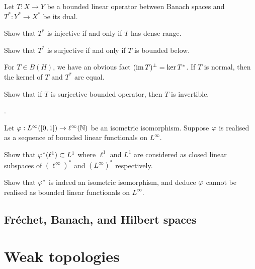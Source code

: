 \documentclass{../note}
\begin{document}
\begin{prb}
Let $T:X\to Y$ be a bounded linear operator between Banach spaces and $T^*:Y^*\to X^*$ be its dual.
\begin{parts}
\item
Show that $T^*$ is injective if and only if $T$ has dense range.
\item
Show that $T^*$ is surjective if and only if $T$ is bounded below.
\end{parts}
\end{prb}

\begin{prb}
For $T\in B(H)$, we have an obvious fact $(\operatorname{im} T)^\perp=\ker T^*$.
If $T$ is normal, then the kernel of $T$ and $T^*$ are equal.
\begin{parts}
\item
Show that if $T$ is surjective bounded operator, then $T$ is invertible.
\end{parts}
\end{prb}


\begin{prb}
.
\end{prb}


\begin{prb}
Let $\varphi:L^\infty([0,1])\to\ell^\infty(\mathbb{N})$ be an isometric isomorphism.
Suppose $\varphi$ is realised as a sequence of bounded linear functionals on $L^\infty$.
\begin{parts}
\item
Show that $\varphi^*(\ell^1)\subset L^1$ where $\ell^1$ and $L^1$ are considered as closed linear subspaces of $(\ell^\infty)^*$ and $(L^\infty)^*$ respectively.
\item Show that $\varphi^*$ is indeed an isometric isomorphism, and deduce $\varphi$ cannot be realised as bounded linear functionals on $L^\infty$.
\end{parts}
\end{prb}





\chapter{Fr\'echet, Banach, and Hilbert spaces}









\part{Weak topologies}
\end{document}
